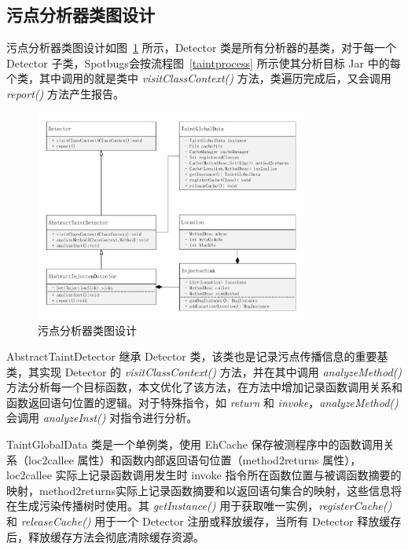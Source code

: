 \subsection{污点分析器类图设计}

污点分析器类图设计如图~\ref{taintDetectorClass} 所示，Detector 类是所有分析器的基类，对于每一个 Detector 子类，Spotbugs会按流程图~\ref{taintprocess} 所示使其分析目标 Jar 中的每个类，其中调用的就是类中 \textit{visitClassContext()} 方法，类遍历完成后，又会调用 \textit{report()} 方法产生报告。

\begin{figure}[!htb]
	\centering
	\includegraphics[width=0.8\textwidth]{FIGs/chapter3/taintDetectorClass.pdf}
	\caption{污点分析器类图设计}\label{taintDetectorClass}
\end{figure}

AbstractTaintDetector 继承 Detector 类，该类也是记录污点传播信息的重要基类，其实现 Detector 的 \textit{visitClassContext()} 方法，并在其中调用 \textit{analyzeMethod()} 方法分析每一个目标函数，本文优化了该方法，在方法中增加记录函数调用关系和函数返回语句位置的逻辑。对于特殊指令，如 \textit{return} 和 \textit{invoke}，\textit{analyzeMethod()} 会调用  \textit{analyzeInst()} 对指令进行分析。

TaintGlobalData 类是一个单例类，使用 EhCache 保存被测程序中的函数调用关系（loc2callee 属性）和函数内部返回语句位置（method2returns 属性），loc2callee 实际上记录函数调用发生时 invoke 指令所在函数位置与被调函数摘要的映射，method2returns实际上记录函数摘要和以返回语句集合的映射，这些信息将在生成污染传播树时使用。其 \textit{getInstance()} 用于获取唯一实例，\textit{registerCache()} 和 \textit{releaseCache()} 用于一个 Detector 注册或释放缓存，当所有 Detector 释放缓存后，释放缓存方法会彻底清除缓存资源。

